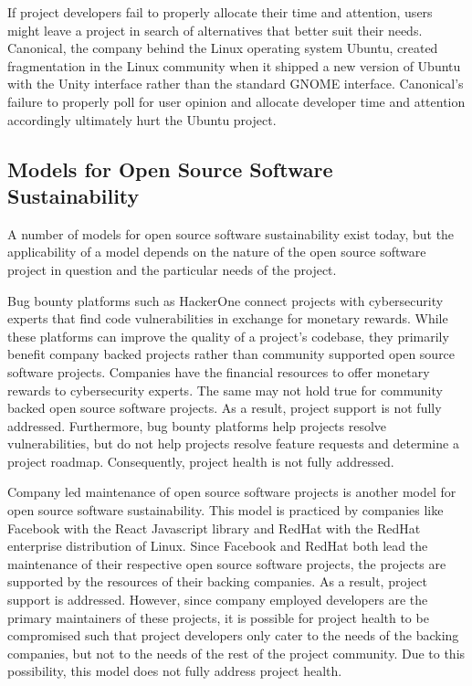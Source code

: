 If project developers fail to properly allocate their time and attention, users
might leave a project in search of alternatives that better suit
their needs. Canonical, the company behind the Linux operating system Ubuntu,
created fragmentation in the Linux community when it shipped a new version of
Ubuntu with the Unity interface rather than the standard GNOME
interface\cite{ubuntuUnity}. Canonical's failure to properly poll for user
opinion and allocate developer time and attention accordingly ultimately hurt
the Ubuntu project.

\subsection{Models for Open Source Software Sustainability}

A number of models for open source software sustainability exist today, but the
applicability of a model depends on the nature of the open source
software project in question and the particular needs of the project.

Bug bounty platforms such as HackerOne connect projects with cybersecurity
experts that find code vulnerabilities in exchange for monetary
rewards\cite{hackerone}. While these platforms can improve the quality of a
project's codebase, they primarily benefit company backed projects rather than community
supported open source software projects. Companies have the financial resources
to offer monetary rewards to cybersecurity experts. The same may not hold true
for community backed open source software projects. As a result, project support
is not fully addressed. Furthermore, bug bounty platforms help projects resolve vulnerabilities,
but do not help projects resolve feature requests and determine a project
roadmap. Consequently, project health is not fully addressed.

Company led maintenance of open source software projects is another model for
open source software sustainability. This model is practiced by companies like
Facebook with the React Javascript library and RedHat with the RedHat enterprise
distribution of Linux\cite{react, redhat}. Since Facebook and RedHat both lead
the maintenance of their respective open source software projects, the projects
are supported by the resources of their backing companies. As a result, project
support is addressed. However, since company employed developers are the primary
maintainers of these projects, it is possible for project health to be
compromised such that project developers only cater to the needs of the backing
companies, but not to the needs of the rest of the project community. Due to
this possibility, this model does not fully address project health.

